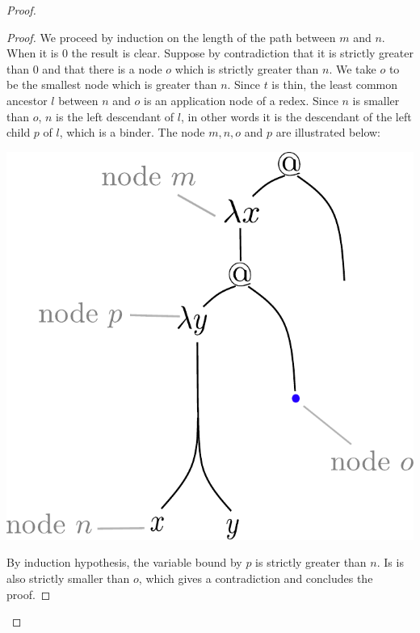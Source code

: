 \begin{proof}
\begin{proof}
We proceed by induction on the length of the path between $m$ and $n$. When it is $0$ the result is clear. Suppose by contradiction that it is strictly greater than $0$ and that there is a node $o$ which is strictly greater than $n$. We take $o$ to be the smallest node which is greater than $n$. Since $t$ is thin, the least common ancestor $l$ between $n$ and $o$ is an application node of a redex. Since $n$ is smaller than $o$, $n$ is the left descendant  of $l$, in other words it is the descendant of the left child $p$
of $l$, which is a binder. The node $m, n, o$ and $p$ are illustrated below:
\begin{center}
		\includegraphics[scale=1.7]{lemma-thin.pdf}
\end{center} 
 By induction hypothesis, the variable
bound by $p$ is strictly greater than $n$. Is is also strictly smaller than $o$, which gives a contradiction and concludes the proof. 
\end{proof}


\end{proof}
